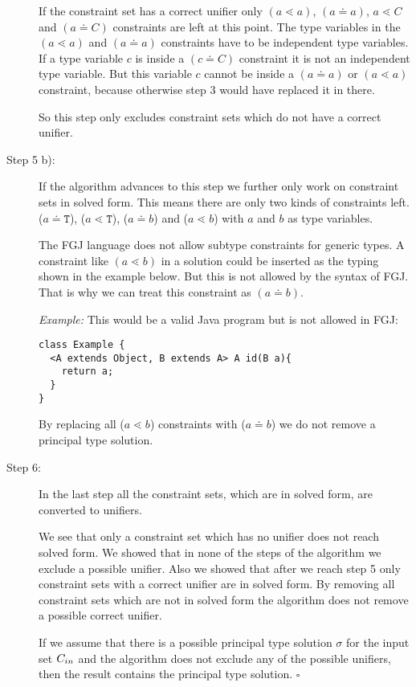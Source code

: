 \begin{description}
If the constraint set has a correct unifier only $(a \lessdot a)$, $(a \doteq a)$, $a \lessdot C$ and $(a \doteq C)$ constraints are left at this point.
The type variables in the $(a \lessdot a)$ and $(a \doteq a)$ constraints have to be independent type variables.
If a type variable $c$ is inside a $(c \doteq C)$ constraint it is not an independent type variable.
But this variable $c$ cannot be inside a $(a \doteq a)$ or $(a \lessdot a)$ constraint, because otherwise step 3 would have replaced it in there.

So this step only excludes constraint sets which do not have a correct unifier.

\item[Step 5 b):]
If the algorithm advances to this step we further only work on constraint sets in solved form.
This means there are only two kinds of constraints left.
($a \doteq \texttt{T}$), ($a \lessdot \texttt{T}$), ($a \doteq b$) and ($a \lessdot b$) with $a$ and $b$ as type variables.


The FGJ language does not allow subtype constraints for generic types.
A constraint like $(a \lessdot b)$ in a solution could be inserted as the typing shown in the example below.
But this is not allowed by the syntax of FGJ.
That is why we can treat this constraint as $(a \doteq b)$.


\textit{Example:}
This would be a valid Java program but is not allowed in FGJ:
\begin{lstlisting}
class Example {
  <A extends Object, B extends A> A id(B a){
    return a;
  }
}
\end{lstlisting}

By replacing all ($a \lessdot b$) constraints with ($a \doteq b$) we do not remove a principal type solution.

\item[Step 6:]
In the last step all the constraint sets, which are in solved form, are converted to unifiers.

We see that only a constraint set which has no unifier does not reach solved form.
We showed that in none of the steps of the \unify{} algorithm we exclude a possible unifier.
Also we showed that after we reach step 5 only constraint sets with a correct unifier are in solved form.
By removing all constraint sets which are not in solved form the algorithm does not
remove a possible correct unifier.

If we assume that there is a possible principal type solution $\sigma$ for the input set $C_{in}$
and the \unify{} algorithm does not exclude any of the possible unifiers,
then the result \unify{} contains the principal type solution.
\hfill $\square$
\end{description}

